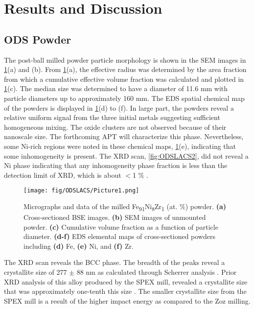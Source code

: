 	\section*{Results and Discussion}



		\subsection*{ODS Powder}

			The post-ball milled powder particle morphology is shown in the SEM images in \ref{fig:ODSLACS1}(a) and (b). From \ref{fig:ODSLACS1}(a), the effective radius was determined by the area fraction from which a cumulative effective volume fraction was calculated and plotted in \ref{fig:ODSLACS1}(c). The median size was determined to have a diameter of 11.6 mm with particle diameters up to approximately 160 mm. The EDS spatial chemical map of the powders is displayed in \ref{fig:ODSLACS1}(d) to (f). In large part, the powders reveal a relative uniform signal from the three initial metals suggesting sufficient homogeneous mixing. The oxide clusters are not observed because of their nanoscale size. The forthcoming APT will characterize this phase. Nevertheless, some Ni-rich regions were noted in these chemical maps, \ref{fig:ODSLACS1}(e), indicating that some inhomogeneity is present. The XRD scan, \ref{fig:ODSLACS2}, did not reveal a Ni phase indicating that any inhomogeneity phase fraction is less than the detection limit of XRD, which is about $<$1 $\%$ .




			\begin{figure}
				\centering
				\texttt{[image: fig/ODSLACS/Picture1.png]}
				\caption[Micrographs and data of the milled Fe\textsubscript{91}Ni\textsubscript{8}Zr\textsubscript{1 }(at. $\%$) powder.]{Micrographs and data of the milled Fe\textsubscript{91}Ni\textsubscript{8}Zr\textsubscript{1 }(at. $\%$) powder. \textbf{(a) }Cross-sectioned BSE images. \textbf{(b)} SEM images of unmounted powder. \textbf{(c) }Cumulative volume fraction as a function of particle diameter. \textbf{(d-f)} EDS elemental maps of cross-sectioned powders including \textbf{(d)} Fe, \textbf{(e)} Ni, and \textbf{(f)} Zr.}
				\label{fig:ODSLACS1}
			\end{figure}




			 The XRD scan reveals the BCC phase. The breadth of the peaks reveal a crystallite size of 277 $ \pm $  88 nm as calculated through Scherrer analysis \cite{RN3429}. Prior XRD analysis of this alloy produced by the SPEX mill, revealed a crystallite size that was approximately one-tenth this size \cite{RN550}. The smaller crystallite size from the SPEX mill is a result of the higher impact energy as compared to the Zoz milling. 



